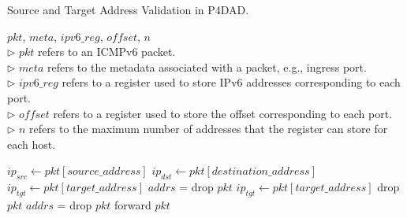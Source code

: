 \documentclass[a4paper,fleqn]{cas-dc}
\begin{document}
        \begin{algorithm}[!t]
        \caption{Source and Target Address Validation in P4DAD.}
        \label{alg:validation}
            \begin{algorithmic}[1]
            \Require $pkt$, $meta$, $ipv6\_reg$, $offset$, $n$\\
            $\triangleright$ $pkt$ refers to an ICMPv6 packet.\\
            $\triangleright$ $meta$ refers to the metadata associated with a packet, e.g., ingress port.\\
            $\triangleright$ $ipv6\_reg$ refers to a register used to store IPv6 addresses corresponding to each port.\\
            $\triangleright$ $of\!\!f\!set$ refers to a register used to store the offset corresponding to each port.\\
            $\triangleright$ $n$ refers to the maximum number of addresses that the register can store for each host.

            \State $ip_{src} \gets pkt[source\_address]$
            \State $ip_{dst} \gets pkt[destination\_address]$ 
                \State $ip_{tgt} \gets pkt[target\_address]$
                    \State $addrs$\! = \!
                        \State drop $pkt$
                    \EndIf
                \EndIf
                \State $ip_{tgt} \gets pkt[target\_address]$
                    \State drop $pkt$
                \EndIf
                \State $addrs$\! = \!
                    \State drop $pkt$
                \EndIf
            \EndIf
            \State forward $pkt$


\end{algorithmic}
\end{algorithm}
\end{document}
